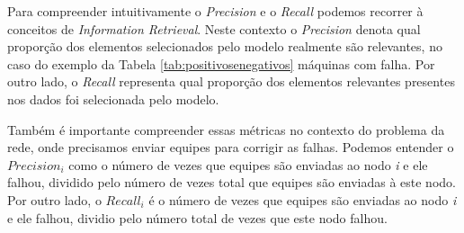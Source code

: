 Para compreender intuitivamente o \textit{Precision} e o \textit{Recall} podemos recorrer à conceitos de \textit{Information Retrieval}.
Neste contexto o \textit{Precision} denota qual proporção dos elementos selecionados pelo modelo realmente são relevantes, no caso do exemplo da Tabela \ref{tab:positivosenegativos} máquinas com falha.
Por outro lado, o \textit{Recall} representa qual proporção dos elementos relevantes presentes nos dados foi selecionada pelo modelo.

Também é importante compreender essas métricas no contexto do problema da rede, onde precisamos enviar equipes para corrigir as falhas.
Podemos entender o $Precision_i$ como o número de vezes que equipes são enviadas ao nodo \textit{i} e ele falhou, dividido pelo número de vezes total que equipes são enviadas à este nodo.
Por outro lado, o $Recall_i$ é o número de vezes que equipes são enviadas ao nodo \textit{i} e ele falhou, dividio pelo número total de vezes que este nodo falhou.
